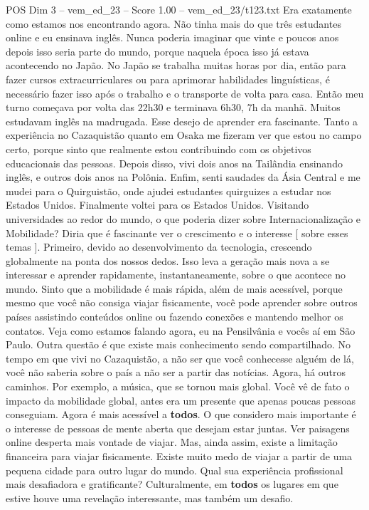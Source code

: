 \begin{textsample}{POS Dim 3 – vem\_ed\_23 – Score 1.00 – vem\_ed\_23/t123.txt}
Era exatamente como estamos nos encontrando agora.
Não tinha mais do que três estudantes online e eu ensinava inglês.
Nunca poderia imaginar que vinte e poucos anos depois isso seria parte do mundo, porque naquela época isso já estava acontecendo no Japão.
No Japão se trabalha muitas horas por dia, então para fazer cursos extracurriculares ou para aprimorar habilidades linguísticas, é necessário fazer isso após o trabalho e o transporte de volta para casa.
Então meu turno começava por volta das 22h30 e terminava 6h30, 7h da manhã.
Muitos estudavam inglês na madrugada.
Esse desejo de aprender era fascinante.
Tanto a experiência no Cazaquistão quanto em Osaka me fizeram ver que estou no campo certo, porque sinto que realmente estou contribuindo com os objetivos educacionais das pessoas.
Depois disso, vivi dois anos na Tailândia ensinando inglês, e outros dois anos na Polônia.
Enfim, senti saudades da Ásia Central e me mudei para o Quirguistão, onde ajudei estudantes quirguizes a estudar nos Estados Unidos.
Finalmente voltei para os Estados Unidos.
Visitando universidades ao redor do mundo, o que poderia dizer sobre Internacionalização e Mobilidade?
Diria que é fascinante ver o crescimento e o interesse [ sobre esses temas ].
Primeiro, devido ao desenvolvimento da tecnologia, crescendo globalmente na ponta dos nossos dedos.
Isso leva a geração mais nova a se interessar e aprender rapidamente, instantaneamente, sobre o que acontece no mundo.
Sinto que a mobilidade é mais rápida, além de mais acessível, porque mesmo que você não consiga viajar fisicamente, você pode aprender sobre outros países assistindo conteúdos online ou fazendo conexões e mantendo melhor os contatos.
Veja como estamos falando agora, eu na Pensilvânia e vocês aí em São Paulo.
Outra questão é que existe mais conhecimento sendo compartilhado.
No tempo em que vivi no Cazaquistão, a não ser que você conhecesse alguém de lá, você não saberia sobre o país a não ser a partir das notícias.
Agora, há outros caminhos.
Por exemplo, a música, que se tornou mais global.
Você vê de fato o impacto da mobilidade global, antes era um presente que apenas poucas pessoas conseguiam.
Agora é mais acessível a \textbf{todos}.
O que considero mais importante é o interesse de pessoas de mente aberta que desejam estar juntas.
Ver paisagens online desperta mais vontade de viajar.
Mas, ainda assim, existe a limitação financeira para viajar fisicamente.
Existe muito medo de viajar a partir de uma pequena cidade para outro lugar do mundo.
Qual sua experiência profissional mais desafiadora e gratificante?
Culturalmente, em \textbf{todos} os lugares em que estive houve uma revelação interessante, mas também um desafio.

\end{textsample}
